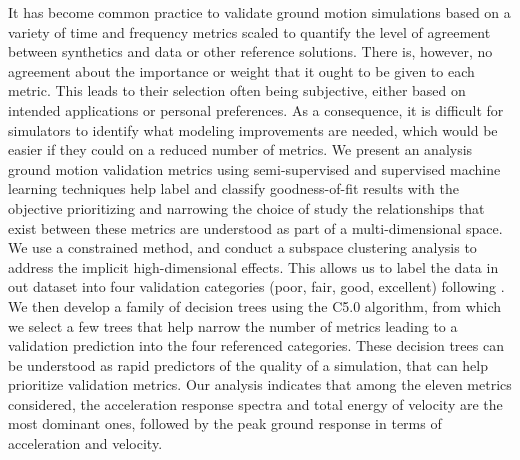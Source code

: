 %
It has become common practice to validate ground motion simulations based on a variety of time and frequency metrics scaled to quantify the level of agreement between synthetics and data or other reference solutions. There is, however, no agreement about the importance or weight that it ought to be given to each metric. This leads to their selection often being subjective, either based on intended applications or personal preferences. As a consequence, it is difficult for simulators to identify what modeling improvements are needed, which would be easier if they could  on a reduced number of metrics. We present an analysis  ground motion validation metrics using semi-supervised and supervised machine learning techniques help label and classify goodness-of-fit results with the objective  prioritizing and narrowing the choice of  study the relationships that exist between  these metrics are understood as part of a multi-dimensional space. We use a constrained \kmeans{} method, and conduct a subspace clustering analysis to address the implicit high-dimensional effects. This allows us to label the data in out dataset into four validation categories (poor, fair, good, excellent) following . We then develop a family of decision trees using the C5.0 algorithm, from which we select a few trees that help narrow the number of metrics leading to a validation prediction into the four referenced categories. These decision trees can be understood as rapid predictors of the quality of a simulation,  that can help prioritize validation metrics. Our analysis indicates that among the eleven metrics considered, the acceleration response spectra and total energy of velocity are the most dominant ones, followed by the peak ground response in terms of acceleration and velocity.
